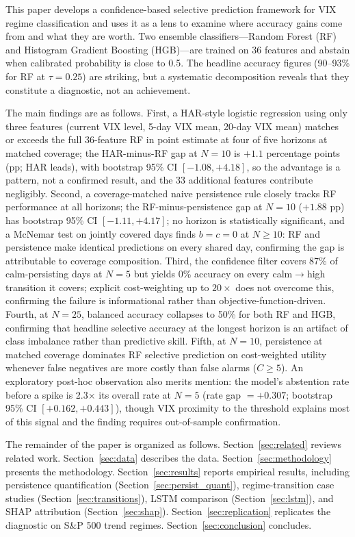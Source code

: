\documentclass[12pt]{article}
\begin{document}
This paper develops a confidence-based selective prediction framework for VIX regime classification and uses it as a lens to examine where accuracy gains come from and what they are worth. Two ensemble classifiers---Random Forest (RF) and Histogram Gradient Boosting (HGB)---are trained on 36 features and abstain when calibrated probability is close to 0.5. The headline accuracy figures (90--93\% for RF at $\tau = 0.25$) are striking, but a systematic decomposition reveals that they constitute a diagnostic, not an achievement.

The main findings are as follows. First, a HAR-style logistic regression using only three features (current VIX level, 5-day VIX mean, 20-day VIX mean) matches or exceeds the full 36-feature RF in point estimate at four of five horizons at matched coverage; the HAR-minus-RF gap at $N = 10$ is $+1.1$ percentage points (pp; HAR leads), with bootstrap 95\% CI $[-1.08, +4.18]$, so the advantage is a pattern, not a confirmed result, and the 33 additional features contribute negligibly. Second, a coverage-matched naive persistence rule closely tracks RF performance at all horizons; the RF-minus-persistence gap at $N = 10$ ($+1.88$ pp) has bootstrap 95\% CI $[-1.11, +4.17]$; no horizon is statistically significant, and a McNemar test on jointly covered days finds $b = c = 0$ at $N \geq 10$: RF and persistence make identical predictions on every shared day, confirming the gap is attributable to coverage composition. Third, the confidence filter covers 87\% of calm-persisting days at $N = 5$ but yields 0\% accuracy on every calm$\to$high transition it covers; explicit cost-weighting up to $20{\times}$ does not overcome this, confirming the failure is informational rather than objective-function-driven. Fourth, at $N = 25$, balanced accuracy collapses to 50\% for both RF and HGB, confirming that headline selective accuracy at the longest horizon is an artifact of class imbalance rather than predictive skill. Fifth, at $N = 10$, persistence at matched coverage dominates RF selective prediction on cost-weighted utility whenever false negatives are more costly than false alarms ($C \geq 5$). An exploratory post-hoc observation also merits mention: the model's abstention rate before a spike is 2.3$\times$ its overall rate at $N = 5$ (rate gap $= +0.307$; bootstrap 95\% CI $[+0.162, +0.443]$), though VIX proximity to the threshold explains most of this signal and the finding requires out-of-sample confirmation.

The remainder of the paper is organized as follows. Section~\ref{sec:related} reviews related work. Section~\ref{sec:data} describes the data. Section~\ref{sec:methodology} presents the methodology. Section~\ref{sec:results} reports empirical results, including persistence quantification (Section~\ref{sec:persist_quant}), regime-transition case studies (Section~\ref{sec:transitions}), LSTM comparison (Section~\ref{sec:lstm}), and SHAP attribution (Section~\ref{sec:shap}). Section~\ref{sec:replication} replicates the diagnostic on S\&P 500 trend regimes. Section~\ref{sec:conclusion} concludes.
\end{document}
